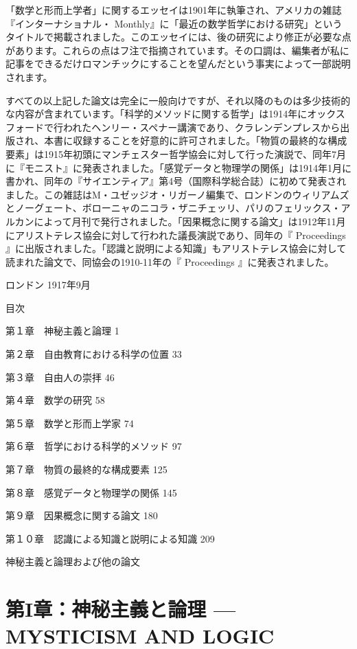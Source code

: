 \documentclass[a4paper,11pt,openany]{ltjsbook}
\begin{document}
「数学と形而上学者」に関するエッセイは1901年に執筆され、アメリカの雑誌『インターナショナル・ Monthly』に「最近の数学哲学における研究」というタイトルで掲載されました。このエッセイには、後の研究により修正が必要な点があります。これらの点はフ注で指摘されています。その口調は、編集者が私に記事をできるだけロマンチックにすることを望んだという事実によって一部説明されます。

すべての以上記した論文は完全に一般向けですが、それ以降のものは多少技術的な内容が含まれています。「科学的メソッドに関する哲学」は1914年にオックスフォードで行われたヘンリー・スペナー講演であり、クラレンデンプレスから出版され、本書に収録することを好意的に許可されました。「物質の最終的な構成要素」は1915年初頭にマンチェスター哲学協会に対して行った演説で、同年7月に『モニスト』に発表されました。「感覚データと物理学の関係」は1914年1月に書かれ、同年の『サイエンティア』第4号（国際科学総合誌）に初めて発表されました。この雑誌はM・ユゼッジオ・リガーノ編集で、ロンドンのウィリアムズとノーグェート、ボローニャのニコラ・ザニチェッリ、パリのフェリックス・アルカンによって月刊で発行されました。「因果概念に関する論文」は1912年11月にアリストテレス協会に対して行われた議長演説であり、同年の『 Proceedings 』に出版されました。「認識と説明による知識」もアリストテレス協会に対して読まれた論文で、同協会の1910-11年の『 Proceedings 』に発表されました。

ロンドン
1917年9月

目次

第１章　神秘主義と論理                           1

第２章　自由教育における科学の位置               33

第３章　自由人の崇拝                          46

第４章　数学の研究                             58

第５章　数学と形而上学家                        74

第６章　哲学における科学的メソッド              97

第７章　物質の最終的な構成要素                  125

第８章　感覚データと物理学の関係                145

第９章　因果概念に関する論文                    180

第１０章　認識による知識と説明による知識          209

神秘主義と論理および他の論文


\chapter{第I章：神秘主義と論理 --- {MYSTICISM AND LOGIC}}
\end{document}
